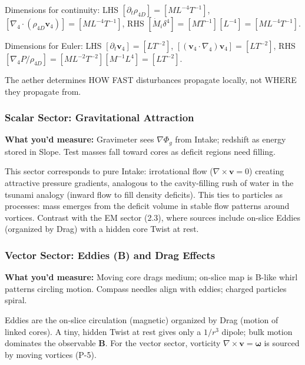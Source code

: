 \begin{tcolorbox}[title=Dimensional Checks]
Dimensions for continuity: LHS $[\partial_t \rho_{4D}] = [M L^{-4} T^{-1}]$, $[\nabla_4 \cdot (\rho_{4D} \mathbf{v}_4)] = [M L^{-4} T^{-1}]$, RHS $[\dot{M}_i \delta^4] = [M T^{-1}] [L^{-4}] = [M L^{-4} T^{-1}]$.

Dimensions for Euler: LHS $[\partial_t \mathbf{v}_4] = [L T^{-2}]$, $[(\mathbf{v}_4 \cdot \nabla_4) \mathbf{v}_4] = [L T^{-2}]$, RHS $[\nabla_4 P / \rho_{4D}] = [M L^{-2} T^{-2}] [M^{-1} L^{4}] = [L T^{-2}]$.
\end{tcolorbox}

\begin{tcolorbox}
The aether determines HOW FAST disturbances propagate locally, not WHERE they propagate from.
\end{tcolorbox}


\subsubsection{Scalar Sector: Gravitational Attraction}

\textbf{What you'd measure:} Gravimeter sees $\nabla\Phi_g$ from Intake; redshift as energy stored in Slope. Test masses fall toward cores as deficit regions need filling.

This sector corresponds to pure Intake: irrotational flow ($\nabla \times \mathbf{v} = 0$) creating attractive pressure gradients, analogous to the cavity-filling rush of water in the tsunami analogy (inward flow to fill density deficits). This ties to particles as processes: mass emerges from the deficit volume in stable flow patterns around vortices. Contrast with the EM sector (2.3), where sources include on-slice Eddies (organized by Drag) with a hidden core Twist at rest.

\subsubsection{Vector Sector: Eddies (B) and Drag Effects}

\textbf{What you'd measure:} Moving core drags medium; on-slice map is B-like whirl patterns circling motion. Compass needles align with eddies; charged particles spiral.

Eddies are the on-slice circulation (magnetic) organized by Drag (motion of linked cores). A tiny, hidden Twist at rest gives only a $1/r^3$ dipole; bulk motion dominates the observable $\mathbf B$. For the vector sector, vorticity $\nabla \times \mathbf{v} = \boldsymbol{\omega}$ is sourced by moving vortices (P-5).

